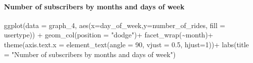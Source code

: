 \documentclass[
]{article}
\newenvironment{Shaded}{\begin{snugshade}}{\end{snugshade}}
\newcommand{\AttributeTok}[1]{\textcolor[rgb]{0.77,0.63,0.00}{#1}}
\newcommand{\DecValTok}[1]{\textcolor[rgb]{0.00,0.00,0.81}{#1}}
\newcommand{\FloatTok}[1]{\textcolor[rgb]{0.00,0.00,0.81}{#1}}
\newcommand{\FunctionTok}[1]{\textcolor[rgb]{0.00,0.00,0.00}{#1}}
\newcommand{\NormalTok}[1]{#1}
\newcommand{\OtherTok}[1]{\textcolor[rgb]{0.56,0.35,0.01}{#1}}
\newcommand{\SpecialCharTok}[1]{\textcolor[rgb]{0.00,0.00,0.00}{#1}}
\newcommand{\StringTok}[1]{\textcolor[rgb]{0.31,0.60,0.02}{#1}}
\begin{document}
\begin{Shaded}
\end{Shaded}

\hypertarget{number-of-subscribers-by-months-and-days-of-week}{%
\paragraph{Number of subscribers by months and days of
week}\label{number-of-subscribers-by-months-and-days-of-week}}

\begin{Shaded}
\begin{Highlighting}[]
\FunctionTok{ggplot}\NormalTok{(}\AttributeTok{data =}\NormalTok{ graph\_4, }\FunctionTok{aes}\NormalTok{(}\AttributeTok{x=}\NormalTok{day\_of\_week,}\AttributeTok{y=}\NormalTok{number\_of\_rides, }\AttributeTok{fill =}\NormalTok{ usertype)) }\SpecialCharTok{+}
  \FunctionTok{geom\_col}\NormalTok{(}\AttributeTok{position =} \StringTok{"dodge"}\NormalTok{)}\SpecialCharTok{+}
  \FunctionTok{facet\_wrap}\NormalTok{(}\SpecialCharTok{\textasciitilde{}}\NormalTok{month)}\SpecialCharTok{+}
  \FunctionTok{theme}\NormalTok{(}\AttributeTok{axis.text.x =} \FunctionTok{element\_text}\NormalTok{(}\AttributeTok{angle =} \DecValTok{90}\NormalTok{, }\AttributeTok{vjust =} \FloatTok{0.5}\NormalTok{, }\AttributeTok{hjust=}\DecValTok{1}\NormalTok{))}\SpecialCharTok{+}
  \FunctionTok{labs}\NormalTok{(}\AttributeTok{title =} \StringTok{"Number of subscribers by months and days of week"}\NormalTok{)}
\end{Highlighting}
\end{Shaded}
\end{document}
